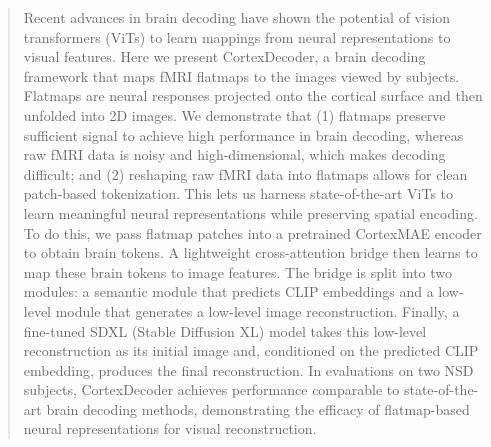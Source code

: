 \begin{abstract}
Recent advances in brain decoding have shown the potential of vision transformers (ViTs) to learn mappings from neural representations to visual features. Here we present CortexDecoder, a brain decoding framework that maps fMRI flatmaps to the images viewed by subjects. Flatmaps are neural responses projected onto the cortical surface and then unfolded into 2D images. We demonstrate that (1) flatmaps preserve sufficient signal to achieve high performance in brain decoding, whereas raw fMRI data is noisy and high-dimensional, which makes decoding difficult; and (2) reshaping raw fMRI data into flatmaps allows for clean patch-based tokenization. This lets us harness state-of-the-art ViTs to learn meaningful neural representations while preserving spatial encoding. To do this, we pass flatmap patches into a pretrained CortexMAE encoder to obtain brain tokens. A lightweight cross-attention bridge then learns to map these brain tokens to image features. The bridge is split into two modules: a semantic module that predicts CLIP embeddings and a low-level module that generates a low-level image reconstruction. Finally, a fine-tuned SDXL (Stable Diffusion XL) model takes this low-level reconstruction as its initial image and, conditioned on the predicted CLIP embedding, produces the final reconstruction. In evaluations on two NSD subjects, CortexDecoder achieves performance comparable to state-of-the-art brain decoding methods, demonstrating the efficacy of flatmap-based neural representations for visual reconstruction.
\end{abstract}
